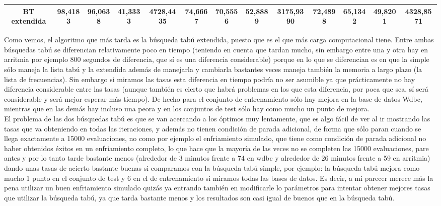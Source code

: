 \documentclass[12pt]{article}
\begin{document}
\begin{table}[H]
{\begin{tabular}{|c|cccc|cccc|cccc|}
BT extendida & \multicolumn{1}{c|}{98,4183}                                                  & \multicolumn{1}{c|}{96,0638}                                                 & \multicolumn{1}{c|}{41,3333} & 4728,4435 & \multicolumn{1}{c|}{74,6667}                                                  & \multicolumn{1}{c|}{70,5556}                                                 & \multicolumn{1}{c|}{52,8889} & 3175,9390 & \multicolumn{1}{c|}{72,4898}                                                  & \multicolumn{1}{c|}{65,1342}                                                 & \multicolumn{1}{c|}{49,8201} & 4328,8571 \\ \hline
\end{tabular}}
\end{table}

Como vemos, el algoritmo que más tarda es la búsqueda tabú extendida, puesto que es el que más carga computacional tiene. Entre ambas búsquedas tabú se diferencian relativamente poco en tiempo (teniendo en cuenta que tardan mucho, sin embargo entre una y otra hay en arritmia por ejemplo 800 segundos de diferencia, que sí es una diferencia considerable) porque en lo que se diferencian es en que la simple sólo maneja la lista tabú y la extendida además de manejarla y cambiarla bastantes veces maneja también la memoria a largo plazo (la lista de frecuencias). Sin embargo si miramos las tasas esta diferencia en tiempo podría no ser asumible ya que prácticamente no hay diferencia considerable entre las tasas (aunque también es cierto que habrá problemas en los que esta diferencia, por poca que sea, sí será considerable y será mejor esperar más tiempo). De hecho para el conjunto de entrenamiento sólo hay mejora en la base de datos Wdbc, mientras que en las demás hay incluso una peora y en los conjuntos de test sólo hay como mucho un punto de mejora.\\

El problema de las dos búsquedas tabú es que se van acercando a los óptimos muy lentamente, que es algo fácil de ver al ir mostrando las tasas que va obteniendo en todas las iteraciones, y además no tienen condición de parada adicional, de forma que sólo paran cuando se llega exactamente a 15000 evaluaciones, no como por ejemplo el enfriamiento simulado, que tiene como condición de parada adicional no haber obtenidos éxitos en un enfriamiento completo, lo que hace que la mayoría de las veces no se completen las 15000 evaluaciones, pare antes y por lo tanto tarde bastante menos (alrededor de 3 minutos frente a 74 en wdbc y alrededor de 26 minutos frente a 59 en arritmia) dando unas tasas de acierto bastante buenas si comparamos con la búsqueda tabú simple, por ejemplo: la búsqueda tabú mejora como mucho 1 punto en el conjunto de test y 6 en el de entrenamiento si miramos todas las bases de datos. Es decir, a mi parecer merece más la pena utilizar un buen enfriamiento simulado quizás ya entrando también en modificarle lo parámetros para intentar obtener mejores tasas que utilizar la búsqueda tabú, ya que tarda bastante menos y los resultados son casi igual de buenos que en la búsqueda tabú.\\
\end{document}
